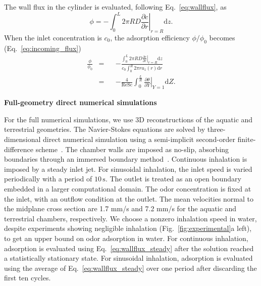 \documentclass[%
 twocolumn,
 amsmath,amssymb,
 aps,prfluids,
 superscriptaddress,
]{revtex4-2}
\newcommand{\Sc}{\mathrm{Sc}}
\newcommand{\Rey}{\mathrm{Re}}
\newcommand{\diff}{\mathrm{d}}
\begin{document}
The wall flux in the cylinder is evaluated, following Eq.~\eqref{eq:wallflux}, as
\begin{equation}
\phi = -\int_0^L 2\pi R D\left. \frac{\partial c}{\partial r}\right|_{r=R} \diff z.
\label{eq:efficiency_cyl}
\end{equation}
When the inlet concentration is $c_0$, the adsorption efficiency $\phi/\phi_0$ becomes (Eq.~\eqref{eq:incoming_flux})
\begin{align}
\frac{\phi}{\phi_0} &=&& -\frac{\int_0^L 2\pi R D\left. \frac{\partial c}{\partial r}\right|_{r=R} \diff z}{c_0\int_0^R2\pi r u_z(r)\diff r}\nonumber\\
&=&& -\frac{4}{\Rey\Sc}\int_0^\frac{L}{R}\left.\frac{\partial\theta}{\partial Y}\right|_{Y=1}\diff Z.
\label{eq:adsorption_efficiency}
\end{align}

\vspace{0.2in}
\noindent \textbf{Full-geometry direct numerical simulations}

For the full numerical simulations, we use 3D reconstructions of the aquatic and terrestrial geometries. The Navier-Stokes equations are solved by three-dimensional direct numerical simulation using a semi-implicit second-order finite-difference scheme~\cite{viola2020fluid}. The chamber walls are imposed as no-slip, absorbing boundaries through an immersed boundary method~\cite{viola_2025}. Continuous inhalation is imposed by a steady inlet jet. For sinusoidal inhalation, the inlet speed is varied periodically with a period of $10\,\mathrm{s}$. The outlet is treated as an open boundary embedded in a larger computational domain. The odor concentration is fixed at the inlet, with an outflow condition at the outlet. The mean velocities normal to the midplane cross section are  1.7 mm/s and 7.2 mm/s for the aquatic and terrestrial chambers, respectively. We choose a nonzero inhalation speed in water, despite experiments showing negligible inhalation (Fig.~\ref{fig:experimental}a left), to get an upper bound on odor adsorption in water. For continuous inhalation, adsorption is evaluated using Eq.~\eqref{eq:wallflux_steady} after the solution reached a statistically stationary state. For sinusoidal inhalation, adsorption is evaluated using the average of Eq.~\eqref{eq:wallflux_steady} over one period after discarding the first ten cycles. 
\end{document}
